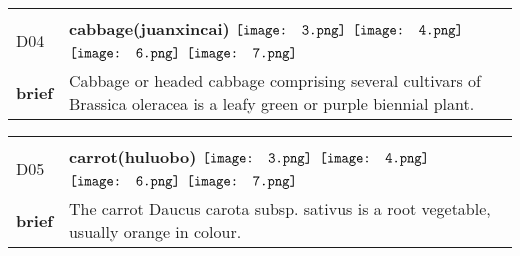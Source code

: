 \documentclass[UTF8]{article}
\begin{document}
            \begin{tabularx}{\textwidth}{p{1.5cm}X}
            \arrayrulecolor{myBlue}
        	\hline\\
            \small{D04}&
            \large{\bfseries{cabbage(juanxincai)}}\hfill
                                                            \phantom{$\vcenter{\hbox{\texttt{[image: 1.png]}}}$}
                                                                \phantom{$\vcenter{\hbox{\texttt{[image: 2.png]}}}$}
                                                                $\vcenter{\hbox{\texttt{[image: 3.png]}}}$
                                                                $\vcenter{\hbox{\texttt{[image: 4.png]}}}$
                                                                \phantom{$\vcenter{\hbox{\texttt{[image: 5.png]}}}$}
                                                                $\vcenter{\hbox{\texttt{[image: 6.png]}}}$
                                                                $\vcenter{\hbox{\texttt{[image: 7.png]}}}$
                                        \\[10pt]
            \large{\bfseries{brief}}&\noindent\parbox[c]{\hsize}{Cabbage or headed cabbage comprising several cultivars of Brassica oleracea is a leafy green or purple biennial plant. } \\[5pt]
            \hline\\[-10pt]
        \end{tabularx}
            \begin{tabularx}{\textwidth}{p{1.5cm}X}
            \arrayrulecolor{myBlue}
        	\hline\\
            \small{D05}&
            \large{\bfseries{carrot(huluobo)}}\hfill
                                                            \phantom{$\vcenter{\hbox{\texttt{[image: 1.png]}}}$}
                                                                \phantom{$\vcenter{\hbox{\texttt{[image: 2.png]}}}$}
                                                                $\vcenter{\hbox{\texttt{[image: 3.png]}}}$
                                                                $\vcenter{\hbox{\texttt{[image: 4.png]}}}$
                                                                \phantom{$\vcenter{\hbox{\texttt{[image: 5.png]}}}$}
                                                                $\vcenter{\hbox{\texttt{[image: 6.png]}}}$
                                                                $\vcenter{\hbox{\texttt{[image: 7.png]}}}$
                                        \\[10pt]
            \large{\bfseries{brief}}&\noindent\parbox[c]{\hsize}{The carrot Daucus carota subsp. sativus is a root vegetable, usually orange in colour. } \\[5pt]
            \hline\\[-10pt]
        \end{tabularx}
\end{document}
